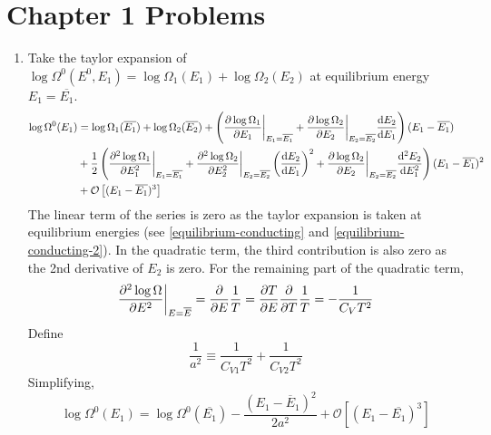 \documentclass{article}
\begin{document}
\section{Chapter 1 Problems}
\begin{sol}[1.1]
    \begin{enumerate}[label=\textbf{(\alph*)}]
        \item Take the taylor expansion of $\log\Omega^0(E^0,E_1)=\log\Omega_1(E_1)+\log\Omega_2(E_2)$ at equilibrium energy $E_1=\overline{E_1}$.
        \begin{equation}
            \begin{aligned}
                \log\Omega^0(E_1)&=\log\Omega_1(\overline{E_1})+\log\Omega_2(\overline{E_2})+\left(\partialderivative{\log\Omega_1}{E_1}\bigg|_{E_1=\overline{E_1}}+\partialderivative{\log\Omega_2}{E_2}\bigg|_{E_2=\overline{E_2}}\derivative{E_2}{E_1}\right)(E_1-\overline{E_1})\\
                &+\frac{1}{2}\left(\partialderivative{^2\log\Omega_1}{E_1^2}\bigg|_{E_1=\overline{E_1}}+\partialderivative{^2\log\Omega_2}{E_2^2}\bigg|_{E_2=\overline{E_2}}\left(\derivative{E_2}{E_1}\right)^2+\partialderivative{\log\Omega_2}{E_2}\bigg|_{E_2=\overline{E_2}}\derivative{^2E_2}{E_1^2}\right)(E_1-\overline{E_1})^2\\
                &+\mathcal{O}\left[(E_1-\overline{E_1})^3\right]
            \end{aligned}
        \end{equation}
        The linear term of the series is zero as the taylor expansion is taken at equilibrium energies (see \eqref{equilibrium-conducting} and \eqref{equilibrium-conducting-2}). In the quadratic term, the third contribution is also zero as the 2nd derivative of $E_2$ is zero. For the remaining part of the quadratic term,
        \begin{equation}
            \partialderivative{^2\log\Omega}{E^2}\bigg|_{E=\overline{E}}=\partialderivative{}{E}\frac{1}{T}=\partialderivative{T}{E}\partialderivative{}{T}\frac{1}{T}=-\frac{1}{C_VT^2}
        \end{equation}
        Define
        \begin{equation}
            \frac{1}{a^2}\equiv\frac{1}{C_{V1}T^2}+\frac{1}{C_{V2}T^2}\label{rms:1-1}
        \end{equation}
        Simplifying,
        \begin{equation}
            \log\Omega^0(E_1)=\log\Omega^0(\overline{E_1})-\frac{(E_1-\overline E_1)^2}{2a^2}+\mathcal{O}\left[(E_1-\overline{E_1})^3\right]\label{gaussian:1-1}

\end{equation}
\end{enumerate}
\end{sol}
\end{document}
